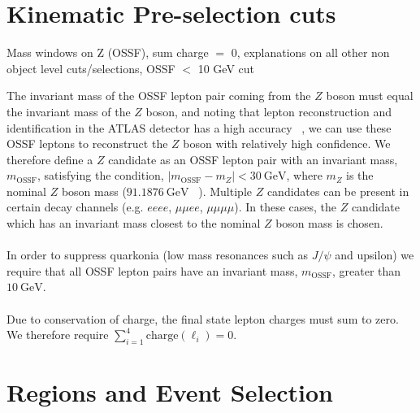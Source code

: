 \section{Kinematic Pre-selection cuts}
Mass windows on Z (OSSF), sum charge $=$ 0, explanations on all other non object level cuts/selections, OSSF $<$ 10 GeV cut


The invariant mass of the OSSF lepton pair coming from the $Z$ boson must equal the invariant mass of the $Z$ boson, and noting that lepton reconstruction and identification in the ATLAS detector has a high accuracy ~\cite{}, we can use these OSSF leptons to reconstruct the $Z$ boson with relatively high confidence. We therefore define a $Z$ candidate as an OSSF lepton pair with an invariant mass, $m_{\text{OSSF}}$, satisfying the condition, $|m_{\text{OSSF}} - m_Z| <  \SI{30}{\GeV}$, where $m_Z$ is the nominal $Z$ boson mass ($\SI{91.1876}{\GeV}$ ~\cite{pdg}). Multiple $Z$ candidates can be present in certain decay channels (e.g. $eeee$, $\mu\mu ee$, $\mu \mu \mu \mu$). In these cases, the $Z$ candidate which has an invariant mass closest to the nominal $Z$ boson mass is chosen.\\\\
In order to suppress quarkonia (low mass resonances such as $J/\psi$ and upsilon) we require that all OSSF lepton pairs have an invariant mass, $m_{\text{OSSF}}$, greater than $\SI{10}{\GeV}$.\\\\
Due to conservation of charge, the final state lepton charges must sum to zero.\\ We therefore require $\displaystyle\sum_{i=1}^{4} \text{charge}(\ell_i) = 0$.



\section{Regions and Event Selection}
\label{sec:regionsAndEventSelection}


